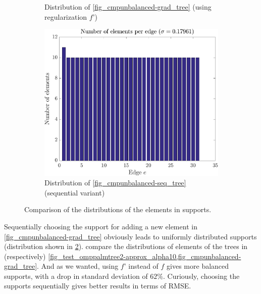 \begin{figure}[!ht]
\begin{subfigure}[b]{0.325\textwidth}
	\caption{Distribution of \cref{fig_cmpunbalanced-grad_tree} (using regularization $f’$)}\label{fig_histo-2}
\end{subfigure}
\begin{subfigure}[b]{0.325\textwidth}\centering
\includegraphics[width=\textwidth]{figures/tree-gradient-vs-sequential/histo_alpha30_grad0.pdf} 
	\caption{Distribution of \cref{fig_cmpunbalanced-seq_tree} (sequential variant)}\label{fig_histo-3}
\end{subfigure}	
\caption{Comparison of the distributions of the elements in supports.}\label{fig_histo}
\end{figure}

\noindent
Sequentially choosing the support for adding a new element in \cref{fig_cmpunbalanced-grad_tree} obviously leads to uniformly distributed supports (distribution shown in \cref{fig_histo-3}).  compare the distributions of elements of the trees in (respectively) \cref{fig_test_omppalmtree2-approx_alpha10,fig_cmpunbalanced-grad_tree}. And as we wanted, using $f’$ instead of $f$ gives more balanced supports, with a drop in standard deviation of $62\%$. Curiously, choosing the supports sequentially gives better results in terms of RMSE.


